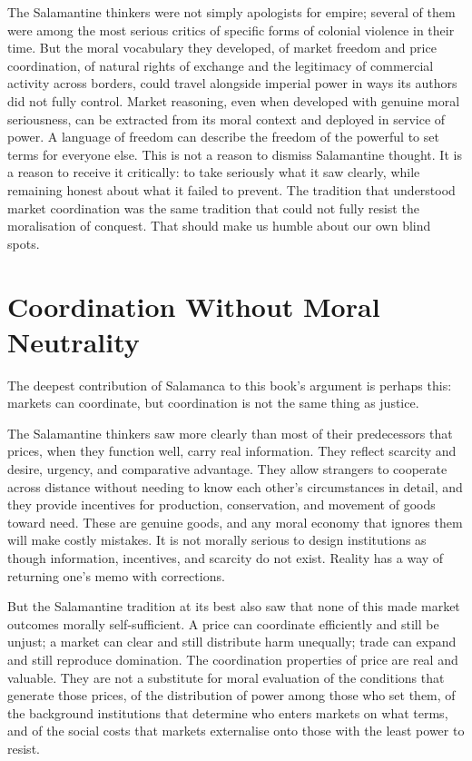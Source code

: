\documentclass[11pt,a4paper,oneside]{book}
\begin{document}
The Salamantine thinkers were not simply apologists for empire; several of them were among the most serious critics of specific forms of colonial violence in their time. But the moral vocabulary they developed, of market freedom and price coordination, of natural rights of exchange and the legitimacy of commercial activity across borders, could travel alongside imperial power in ways its authors did not fully control. Market reasoning, even when developed with genuine moral seriousness, can be extracted from its moral context and deployed in service of power. A language of freedom can describe the freedom of the powerful to set terms for everyone else. This is not a reason to dismiss Salamantine thought. It is a reason to receive it critically: to take seriously what it saw clearly, while remaining honest about what it failed to prevent. The tradition that understood market coordination was the same tradition that could not fully resist the moralisation of conquest. That should make us humble about our own blind spots.

\section*{Coordination Without Moral Neutrality}

The deepest contribution of Salamanca to this book's argument is perhaps this: markets can coordinate, but coordination is not the same thing as justice.

The Salamantine thinkers saw more clearly than most of their predecessors that prices, when they function well, carry real information. They reflect scarcity and desire, urgency, and comparative advantage. They allow strangers to cooperate across distance without needing to know each other's circumstances in detail, and they provide incentives for production, conservation, and movement of goods toward need. These are genuine goods, and any moral economy that ignores them will make costly mistakes. It is not morally serious to design institutions as though information, incentives, and scarcity do not exist. Reality has a way of returning one's memo with corrections.

But the Salamantine tradition at its best also saw that none of this made market outcomes morally self-sufficient. A price can coordinate efficiently and still be unjust; a market can clear and still distribute harm unequally; trade can expand and still reproduce domination. The coordination properties of price are real and valuable. They are not a substitute for moral evaluation of the conditions that generate those prices, of the distribution of power among those who set them, of the background institutions that determine who enters markets on what terms, and of the social costs that markets externalise onto those with the least power to resist.
\end{document}
